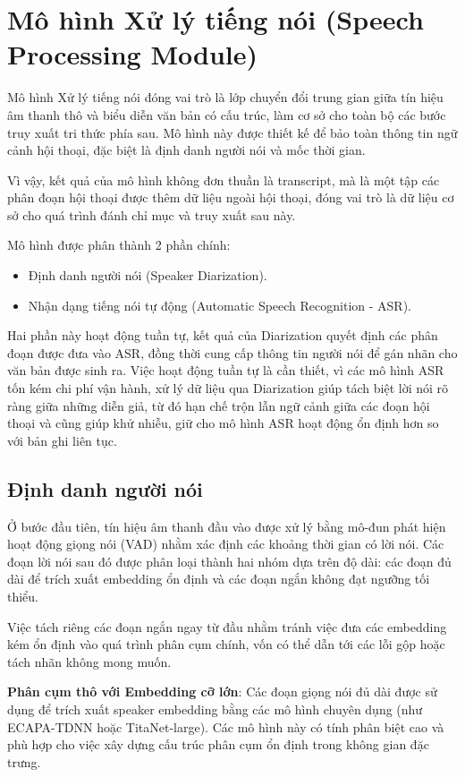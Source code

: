 \section{Mô hình Xử lý tiếng nói (Speech Processing Module)}
Mô hình Xử lý tiếng nói đóng vai trò là lớp chuyển đổi trung gian giữa tín hiệu âm thanh thô và biểu diễn văn bản có cấu trúc, làm cơ sở cho toàn bộ các bước truy xuất tri thức phía sau. Mô hình này được thiết kế để bảo toàn thông tin ngữ cảnh hội thoại, đặc biệt là định danh người nói và mốc thời gian.

Vì vậy, kết quả của mô hình không đơn thuần là transcript, mà là một tập các phân đoạn hội thoại được thêm dữ liệu ngoài hội thoại, đóng vai trò là dữ liệu cơ sở cho quá trình đánh chỉ mục và truy xuất sau này.

Mô hình được phân thành 2 phần chính:
\begin{itemize}
    \item Định danh người nói (Speaker Diarization).
    \item Nhận dạng tiếng nói tự động (Automatic Speech Recognition - ASR). 
\end{itemize}

Hai phần này hoạt động tuần tự, kết quả của Diarization quyết định các phân đoạn được đưa vào ASR, đồng thời cung cấp thông tin người nói để gán nhãn cho văn bản được sinh ra. Việc hoạt động tuần tự là cần thiết, vì các mô hình ASR tốn kém chi phí vận hành, xử lý dữ liệu qua Diarization giúp tách biệt lời nói rõ ràng giữa những diễn giả, từ đó hạn chế trộn lẫn ngữ cảnh giữa các đoạn hội thoại và cũng giúp khử nhiễu, giữ cho mô hình ASR hoạt động ổn định hơn so với bản ghi liên tục.

\subsection{Định danh người nói}
Ở bước đầu tiên, tín hiệu âm thanh đầu vào được xử lý bằng mô-đun phát hiện hoạt động giọng nói (VAD) nhằm xác định các khoảng thời gian có lời nói. Các đoạn lời nói sau đó được phân loại thành hai nhóm dựa trên độ dài: các đoạn đủ dài để trích xuất embedding ổn định và các đoạn ngắn không đạt ngưỡng tối thiểu.

Việc tách riêng các đoạn ngắn ngay từ đầu nhằm tránh việc đưa các embedding kém ổn định vào quá trình phân cụm chính, vốn có thể dẫn tới các lỗi gộp hoặc tách nhãn không mong muốn.

\textbf{Phân cụm thô với Embedding cỡ lớn}:
Các đoạn giọng nói đủ dài được sử dụng để trích xuất speaker embedding bằng các mô hình chuyên dụng (như ECAPA-TDNN hoặc TitaNet-large). Các mô hình này có tính phân biệt cao và phù hợp cho việc xây dựng cấu trúc phân cụm ổn định trong không gian đặc trưng.

